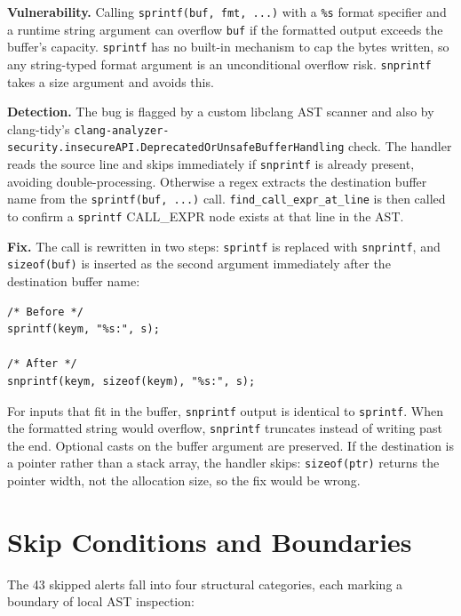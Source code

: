 \textbf{Vulnerability.} Calling \texttt{sprintf(buf, fmt, ...)} with a \texttt{\%s} format specifier and a runtime string argument can overflow \texttt{buf} if the formatted output exceeds the buffer's capacity. \texttt{sprintf} has no built-in mechanism to cap the bytes written, so any string-typed format argument is an unconditional overflow risk. \texttt{snprintf} takes a size argument and avoids this.

\textbf{Detection.} The bug is flagged by a custom libclang AST scanner and also by clang-tidy's \texttt{clang-analyzer-security.insecureAPI.Deprecat\-edOrUnsafeBufferHandling} check. The handler reads the source line and skips immediately if \texttt{snprintf} is already present, avoiding double-processing. Otherwise a regex extracts the destination buffer name from the \texttt{sprintf(buf,}\allowbreak\texttt{ ...)} call. \texttt{find\_call\_expr\_at\_line} is then called to confirm a \texttt{sprintf} CALL\_EXPR node exists at that line in the AST.

\textbf{Fix.} The call is rewritten in two steps: \texttt{sprintf} is replaced with \texttt{snprintf}, and \texttt{sizeof(buf)} is inserted as the second argument immediately after the destination buffer name:

\begin{lstlisting}[caption={CWE-120 fix: sprintf replaced with snprintf}]
/* Before */
sprintf(keym, "%s:", s);

/* After */
snprintf(keym, sizeof(keym), "%s:", s);
\end{lstlisting}

For inputs that fit in the buffer, \texttt{snprintf} output is identical to \texttt{sprintf}. When the formatted string would overflow, \texttt{snprintf} truncates instead of writing past the end. Optional casts on the buffer argument are preserved. If the destination is a pointer rather than a stack array, the handler skips: \texttt{sizeof(ptr)} returns the pointer width, not the allocation size, so the fix would be wrong.

\section{Skip Conditions and Boundaries}
\label{sec:skip}

The 43 skipped alerts fall into four structural categories, each marking a boundary of local AST inspection:


